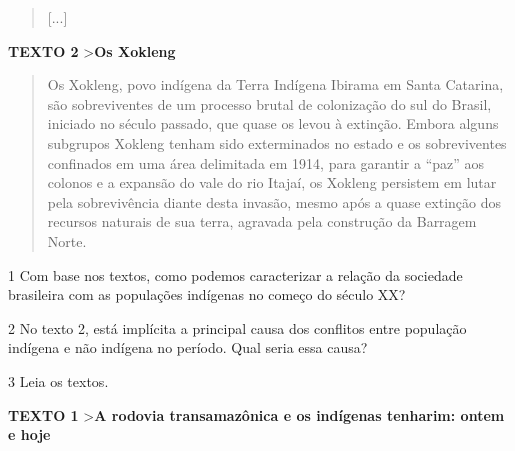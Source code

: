 \begin{quote}
{[}...{]}
\end{quote}


\textbf{TEXTO 2} \textgreater{}\textbf{Os Xokleng}

\begin{quote}
Os Xokleng, povo indígena da Terra Indígena Ibirama em Santa Catarina,
são sobreviventes de um processo brutal de colonização do sul do Brasil,
iniciado no século passado, que quase os levou à extinção. Embora alguns
subgrupos Xokleng tenham sido exterminados no estado e os sobreviventes
confinados em uma área delimitada em 1914, para garantir a ``paz'' aos
colonos e a expansão do vale do rio Itajaí, os Xokleng persistem em
lutar pela sobrevivência diante desta invasão, mesmo após a quase
extinção dos recursos naturais de sua terra, agravada pela construção da
Barragem Norte.
\end{quote}


\num{1} Com base nos textos, como podemos caracterizar a relação da
sociedade brasileira com as populações indígenas no começo do século XX?


\num{2} No texto 2, está implícita a principal causa dos conflitos entre
população indígena e não indígena no período. Qual seria essa causa?


\num{3} Leia os textos.

\textbf{TEXTO 1}
\textgreater{}\textbf{A rodovia transamazônica e os indígenas tenharim: ontem e hoje}

